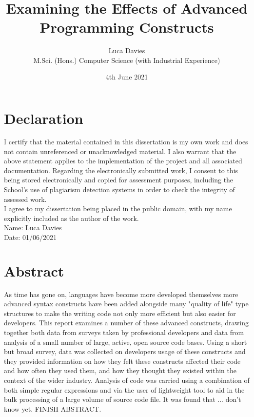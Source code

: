 \documentclass{article}
\title{\textbf{Examining the Effects of Advanced Programming Constructs}}
\author{
Luca Davies \\ M.Sci. (Hons.) Computer Science (with Industrial Experience)}
\date{4th June 2021}
\begin{document}
\maketitle

\newpage
\section*{Declaration}
    I certify that the material contained in this dissertation is my own work and does not contain unreferenced or unacknowledged material. I also warrant that the above statement applies to the implementation of the project and all associated documentation. Regarding the electronically submitted work, I consent to this being stored electronically and copied for assessment purposes, including the School’s use of plagiarism detection systems in order to check the integrity of assessed work. \\
    I agree to my dissertation being placed in the public domain, with my name explicitly included as the author of the work. \\
    
    \noindent
    Name: Luca Davies\\
    Date: 01/06/2021
\newpage
\section*{Abstract}
    As time has gone on, languages have become more developed themselves more advanced syntax constructs have been added alongside many "quality of life" type structures to make the writing code not only more efficient but also easier for developers. This report examines a number of these advanced constructs, drawing together both data from surveys taken by professional developers and data from analysis of a small number of large, active, open source code bases. Using a short but broad survey, data was collected on developers usage of these constructs and they provided information on how they felt these constructs affected their code and how often they used them, and how they thought they existed within the context of the wider industry. Analysis of code was carried using a combination of both simple regular expressions and via the user of lightweight tool to aid in the bulk processing of a large volume of source code file. It was found that ... don't know yet. FINISH ABSTRACT.
    \newline
\newpage
\tableofcontents
\newpage
\end{document}
